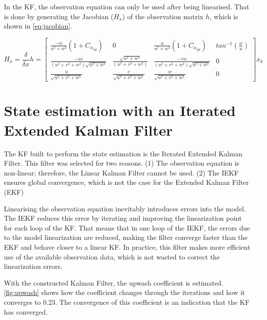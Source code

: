 In the KF, the observation equation can only be used after being linearised. That is done by generating the Jacobian ($H_x$) of the observation matrix $h$, which is shown in \autoref{eq:jacobian}.

\begin{equation}\label{eq:jacobian}
	H_x = \frac{\delta}{\delta x}h =
\begin{bmatrix}
\frac{-w}{u^2+w^2}(1+C_{\alpha_{up}}) & 0 & \frac{u}{u^2+w^2}(1+C_{\alpha_{up}}) & tan^{-1}(\frac{w}{u}) \\

\frac{-uv}{(u^2+v^2+w^2)\sqrt{u^2+w^2}} & \frac{\sqrt{u^2+w^2}}{(u^2+v^2+w^2)} & \frac{-vw}{(u^2+v^2+w^2)\sqrt{u^2+w^2}} & 0 \\
\frac{u}{\sqrt{u^2+v^2+w^2}} & \frac{v}{\sqrt{u^2+v^2+w^2}} & \frac{w}{\sqrt{u^2+v^2+w^2}} & 0
\end{bmatrix}  x_k
\end{equation}

\section{State estimation with an Iterated Extended Kalman Filter}
The KF built to perform the state estimation is the Iterated Extended Kalman Filter. This filter was selected for two reasons. (1) The observation equation is non-linear; therefore, the Linear Kalman Filter cannot be used. (2) The IEKF ensures global convergence, which is not the case for the Extended Kalman Filter (EKF)

Linearising the observation equation inevitably introduces errors into the model. The IEKF reduces this error by iterating and improving the linearization point for each loop of the KF. That means that in one loop of the IEKF, the errors due to the model linearization are reduced, making the filter converge faster than the EKF and behave closer to a linear KF. In practice, this filter makes more efficient use of the available observation data, which is not wasted to correct the linearization errors.



With the constructed Kalman Filter, the upwash coefficient is estimated. \autoref{fig:upwash} shows how the coefficient changes through the iterations and how it converges to 0.23. The convergence of this coefficient is an indication that the KF has converged.

